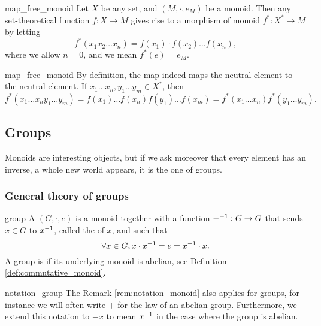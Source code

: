 \begin{clem}{}{map_free_monoid}
    Let \( X \) be any set, and \( (M, \cdot, e_M) \) be a monoid. Then any set-theoretical function \( f : X \to M \) gives rise to a morphism of monoid \( f^* : X^* \to M \) by letting
    \begin{equation*}
        f^*(x_1 x_2 \dots x_n) = f(x_1)\cdot f(x_2) \dots f(x_n),
    \end{equation*}
    where we allow \( n = 0 \), and we mean \( f^*(e) = e_M \).
\end{clem}
\begin{lemproof}{map_free_monoid}
    By definition, the map indeed maps the neutral element to the neutral element. If \( x_1\dots x_n, y_1 \dots y_m \in X^* \), then 
    \begin{equation*}
        f^*(x_1\dots x_n y_1 \dots y_m) = f(x_1) \dots f(x_n)f(y_1) \dots f(x_m) = f^*(x_1\dots x_n)f^*(y_1\dots y_m).
    \end{equation*}
\end{lemproof}

\subsection{Groups}

Monoids are interesting objects, but if we ask moreover that every element has an inverse, a whole new world appears, it is the one of groups.

\subsubsection{General theory of groups}

\begin{cdef}{}{group}
    A  \( (G, \cdot, e) \) is a monoid together with a function \( -^{-1} : G \to G \) that sends \( x \in G \) to \( x^{-1} \), called the  of \( x \), and such that
    \begin{equation*}
        \forall x \in G, x \cdot x^{-1} = e = x^{-1} \cdot x.
    \end{equation*}
    A group is  if its underlying monoid is abelian, see Definition \ref{def:commutative_monoid}.
\end{cdef}

\begin{crem}{}{notation_group}
    The Remark \ref{rem:notation_monoid} also applies for groups, for instance we will often write \( + \) for the law of an abelian group. Furthermore, we extend this notation to \( - x \) to mean \( x^{-1} \) in the case where the group is abelian.
\end{crem}

